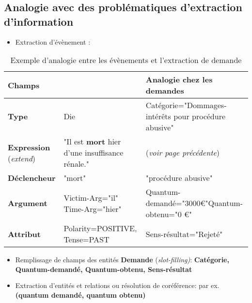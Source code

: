 \subsection{Analogie avec des problématiques d'extraction d'information}
\begin{itemize}
\item Extraction d'évènement : 
\end{itemize}
\begin{table}[h]
\small
\begin{tabular}{|p{}|p{}|p{}|}
\hline
\textbf{Champs} & \textbf{\cite{ace2005event}} & \textbf{Analogie chez les demandes} \\ \hline
\textbf{Type} &  Die & Catégorie="Dommages-intérêts pour procédure abusive" \\ \hline
\textbf{Expression} (\textit{extend}) & "Il est \textbf{mort} hier d'une insuffisance rénale."  & (\textit{voir page précédente}) \\ \hline
\textbf{Déclencheur} & "mort" & "procédure abusive"\\ \hline
\textbf{Argument} & Victim-Arg="il" \linebreak Time-Arg="hier"  & Quantum-demandé="3000\euro{}"\linebreak  Quantum-obtenu="0 \euro{}"\ \\ \hline
\textbf{Attribut} & Polarity=POSITIVE, Tense=PAST & Sens-résultat="Rejeté" \\ \hline
\end{tabular}
\caption{Exemple d'analogie entre les évènements et l'extraction de demande}
\end{table}
\begin{itemize}
\item Remplissage de champs des entités \textbf{Demande} (\textit{slot-filling)}: \textbf{Catégorie, Quantum-demandé, Quantum-obtenu, Sens-résultat}
\item Extraction d'entités et relations ou résolution de coréférence: par ex. \textbf{(quantum demandé, quantum obtenu)}
\end{itemize}

